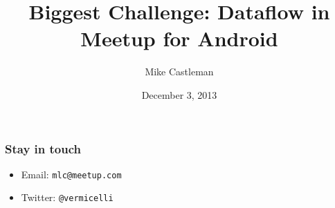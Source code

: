 \documentclass[xetex]{beamer}
\title[Biggest Challenge]{Biggest Challenge: Dataflow in Meetup for Android}
\author{Mike Castleman}
\institute[Meetup]{Meetup}
\date[2013-12-3]{December 3, 2013}
\begin{document}
\begin{frame}
\titlepage
\end{frame}

\begin{frame}
\frametitle{Stay in touch}
\begin{itemize}
\item Email: \texttt{mlc@meetup.com}
\item Twitter: \texttt{@vermicelli}
\end{itemize}
\end{frame}
\end{document}
